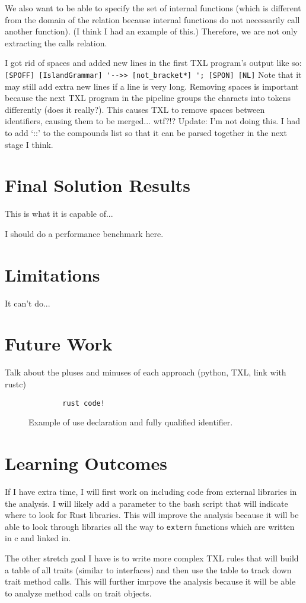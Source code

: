 \documentclass[11pt]{article}
\begin{document}
We also want to be able to specify the set of internal functions (which is different from the domain of the relation because internal functions do not necessarily call another function).
(I think I had an example of this.)
Therefore, we are not only extracting the calls relation.

I got rid of spaces and added new lines in the first TXL program's output like so:
\lstinline{[SPOFF] [IslandGrammar] '-->> [not_bracket*] '; [SPON] [NL]}
Note that it may still add extra new lines if a line is very long.
Removing spaces is important because the next TXL program in the pipeline groups the characts into tokens differently (does it really?).
This causes TXL to remove spaces between identifiers, causing them to be merged... wtf?!?
Update:
I'm not doing this.
I had to add `::' to the compounds list so that it can be parsed together in the next stage I think.

\section{Final Solution Results}
This is what it is capable of...

I should do a performance benchmark here.

\section{Limitations}
It can't do...

\section{Future Work}

Talk about the pluses and minuses of each approach (python, TXL, link with rustc)


\begin{figure}
    \caption{Example of use declaration and fully qualified identifier.}
    \label{fig:qualifiers}
    \begin{lstlisting}
        rust code!
    \end{lstlisting}
\end{figure}

\section{Learning Outcomes}
If I have extra time, I will first work on including code from external libraries in the analysis.
I will likely add a parameter to the bash script that will indicate where to look for Rust libraries.
This will improve the analysis because it will be able to look through libraries all the way to \lstinline{extern} functions which are written in c and linked in.

The other stretch goal I have is to write more complex TXL rules that will build a table of all traits (similar to interfaces) and then use the table to track down trait method calls.
This will further imrpove the analysis because it will be able to analyze method calls on trait objects.
\end{document}

